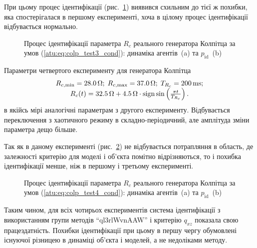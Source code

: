 При цьому процес ідентифікації (рис.~\ref{atu:f:colp_r_id_3}) виявився
схильним до тієї ж похибки, яка спостерігалася в першому
експерименті, хоча в цілому процес ідентифікації відбувається
нормально.


\begin{figure}[htb!]
  \caption{Процес ідентифікації параметра $ R_c $ реального генератора Колпітца за умов (\ref{atu:eq:colp_test3_cond}): динаміка агентів~(a) та $p_\mathrm{id}$~(b)}
\label{atu:f:colp_r_id_3}
\end{figure}



Параметри четвертого експерименту для генератора Колпітца
%
\begin{equation}
  \begin{array}{c}
    R_{c,\min} = \SI{28.0}{\ohm};
    \;
    R_{c,\max} = \SI{37.0}{\ohm};
    \;
    T_{R_c} = \SI{200}{\milli\second};
  \\
    R_c(t) = \SI{32.5}{\ohm} + \SI{4.5}{\ohm} \cdot \operatorname*{sign} \sin \left( \frac{\pi t}{T_{R_c}}  \right).
  \end{array}
  \label{atu:eq:colp_test4_cond}
\end{equation}
%
в якійсь мірі аналогічні параметрам з другого
експерименту. Відбувається переключення з хаотичного режиму в
складно-періодичний, але амплітуда зміни параметра дещо більше.

Так як в даному експерименті (рис.~\ref{atu:f:colp_r_id_4}) не відбувається
потрапляння в область, де залежності критерію для моделі
і об'єкта помітно відрізняються, то і похибка ідентифікації
менше, ніж в першому і третьому експерименті.

\begin{figure}[htb!]
  \caption{Процес ідентифікації параметра $ R_c $ реального генератора Колпітца за умов (\ref{atu:eq:colp_test4_cond}): динаміка агентів~(a) та $p_\mathrm{id}$~(b)}
  \label{atu:f:colp_r_id_4}
\end{figure}

Таким чином, для всіх чотирьох експериментів система
ідентифікації з використанням групи методів ``ql3rlWvnAAW'' і
критерію
$q_{xz} $ показала свою працездатність. Похибки ідентифікації при
цьому в першу чергу обумовлені існуючої різницею в динаміці
об'єкта і моделей, а не недоліками методу.


